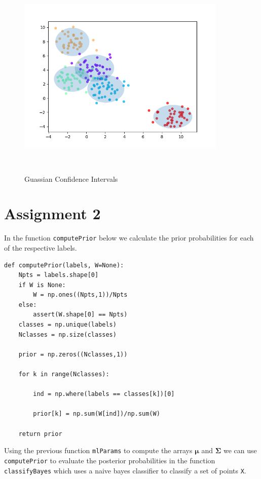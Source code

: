 \documentclass{article}
\begin{document}
\begin{figure}
    \centering
    \includegraphics[height=100mm, width=100mm]{Figure_1.png}
    \caption{Guassian Confidence Intervals}
\end{figure}


\section*{Assignment 2}

In the function \texttt{computePrior} below we calculate the prior probabilities for each of the respective labels. 

\begin{lstlisting}
def computePrior(labels, W=None):
    Npts = labels.shape[0]
    if W is None:
        W = np.ones((Npts,1))/Npts
    else:
        assert(W.shape[0] == Npts)
    classes = np.unique(labels)
    Nclasses = np.size(classes)

    prior = np.zeros((Nclasses,1))
    
    for k in range(Nclasses):
        
        ind = np.where(labels == classes[k])[0]
        
        prior[k] = np.sum(W[ind])/np.sum(W)

    return prior
\end{lstlisting}

Using the previous function \texttt{mlParams} to compute the arrays $\boldsymbol\mu$ and $\boldsymbol\Sigma$ we can use \texttt{computePrior} to evaluate the posterior probabilities in the function \texttt{classifyBayes} which uses a naive bayes classifier to classify a set of points \texttt{X}.
\end{document}
